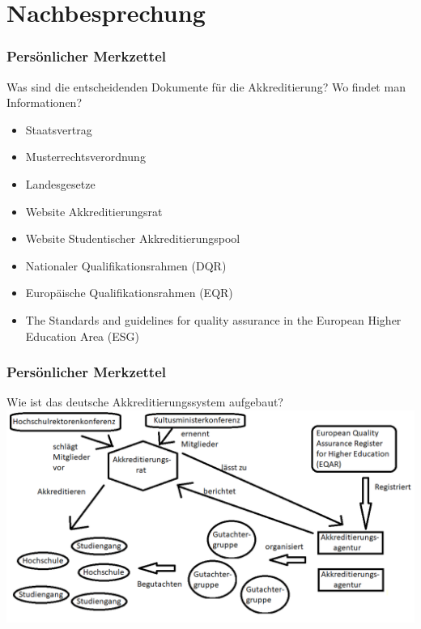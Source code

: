\documentclass{beamer}
\begin{document}
\section{Nachbesprechung}
\frame{\tableofcontents[currentsection]}
\begin{frame}
\frametitle{Persönlicher Merkzettel}
Was sind die entscheidenden Dokumente für die Akkreditierung? Wo findet man Informationen?
\vspace{0.5cm}
\begin{itemize}
\item Staatsvertrag
\item Musterrechtsverordnung
\item Landesgesetze
\end{itemize}
\pause
\begin{itemize}
\item Website Akkreditierungsrat%
\item Website Studentischer Akkreditierungspool%
\end{itemize}
\pause
\begin{itemize}
\item Nationaler Qualifikationsrahmen (DQR)
\item Europäische Qualifikationsrahmen (EQR)
\item The Standards and guidelines for quality assurance in the European Higher Education Area (ESG)
\end{itemize}
\end{frame}
\begin{frame}
\frametitle{Persönlicher Merkzettel}
Wie ist das deutsche Akkreditierungssystem aufgebaut?
\vspace{0.5cm}
  \includegraphics[width=1\textwidth]{Schaubild2.png}
\end{frame}
\end{document}
